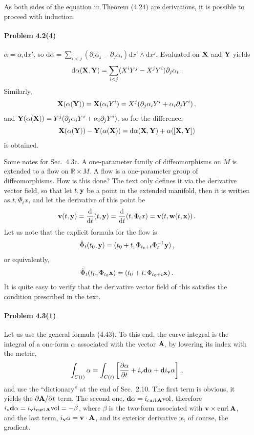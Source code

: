 \documentclass[a4paper,12pt]{article}
\def\d{\mathrm{d}}
\newcommand{\problem}[1]{\paragraph{Problem #1}}
\begin{document}
As both sides of the equation in Theorem (4.24) are derivations, it is possible to proceed with induction.


\problem{4.2(4)} $\alpha = \alpha_i \d x^i$, so $\d \alpha = \sum_{i<j}(\partial_i \alpha_j-\partial_j \alpha_i) \d x^i \wedge \d x^j$. Evaluated on ${\bf X}$ and ${\bf Y}$ yields
\[
 \d \alpha({\bf X}, {\bf Y}) = \sum_{i<j}(X^i Y^j -X^j Y^i) \partial_j \alpha_i\,.
\]
Similarly,
\[
 {\bf X}(\alpha({\bf Y})) = {\bf X}(\alpha_i Y^i) = X^j(\partial_j \alpha_i Y^i + \alpha_i \partial_j Y^i)\,,
\]
and ${\bf Y}(\alpha({\bf X})) = Y^j(\partial_j \alpha_i Y^i + \alpha_i \partial_j Y^i)$, so for the difference,
\[
 {\bf X}(\alpha({\bf Y})) - {\bf Y}(\alpha({\bf X})) = \d \alpha({\bf X}, {\bf Y}) + \alpha( [{\bf X}, {\bf Y}])
\]
is obtained.


Some notes for Sec.\ 4.3c. A one-parameter family of diffeomorphisms on $M$ is extended to a flow on $\mathbb{R}\times M$. A flow is a one-parameter group of diffeomorphisms. How is this done? The text only defines it via the derivative vector field, so that let $t, {\bf y}$ be a point in the extended manifold, then it is written as $t, \Phi_t x$, and let the derivative of this point be
\[
 {\bf v}(t, {\bf y}) = \frac{\d}{\d t} (t, {\bf y}) = \frac{\d}{\d t} (t, \Phi_t x) = {\bf v}(t, {\bf w}(t, {\bf x}))\,.
\]
Let us note that the explicit formula for the flow is
\[
 {\hat\Phi}_t(t_0, {\bf y}) = (t_0+t, \Phi_{t_0+t}\Phi_t^{-1}{\bf y})\,,
\]
or equivalently,
\[
 {\hat\Phi}_{t}(t_0, \Phi_{t_0} {\bf x}) = (t_0+t, \Phi_{t_0+t} {\bf x})\,.
\]
It is quite easy to verify that the derivative vector field of this satisfies the condition prescribed in the text.


\problem{4.3(1)} Let us use the general formula (4.43). To this end, the curve integral is the integral of a one-form $\alpha$ associated with the vector ${\bf A}$, by lowering its index with the metric,
\[
 \int_{C(t)} \alpha = \int_{C(t)}\left[ \frac{\partial \alpha}{\partial t} + i_{\rm v}{\bf d}\alpha + {\bf d}i_{\bf v}\alpha \right]\,,
\]
and use the ``dictionary'' at the end of Sec.\ 2.10. The first term is obvious, it yields the $\partial{\bf A}/\partial t$ term. The second one, ${\bf d}\alpha = i_{\rm curl\,\bf A}{\rm vol}$, therefore $i_{\rm v} {\bf d}\alpha = i_{\bf v}i_{\rm curl\,\bf A}{\rm vol} = -\beta$, where $\beta$ is the two-form associated with ${\bf v}\times \mathop{\rm curl}{\bf A}$, and the last term, $i_{\bf v}\alpha = {\bf v}\cdot {\bf A}$, and its exterior derivative is, of course, the gradient.
\end{document}
